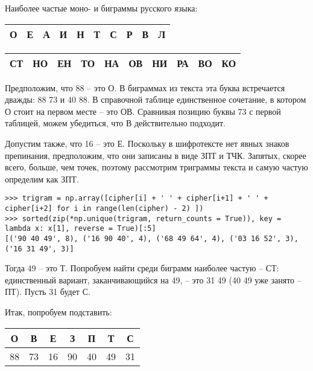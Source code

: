 \documentclass[letterpaper,11pt,openany]{book}
\begin{document}
Наиболее частые моно- и биграммы русского языка:

\medskip

{\centering
\begin{tabular}{||c|c|c|c|c|c|c|c|c|c||}
\hline
\textbf{О} & \textbf{Е} & \textbf{А} & \textbf{И} & \textbf{Н} & \textbf{Т} & \textbf{С} & \textbf{Р} & \textbf{В} & \textbf{Л} \\
\hline
\end{tabular}

}

\medskip

{\centering
\begin{tabular}{||c|c|c|c|c|c|c|c|c|c||}
\hline
\textbf{СТ} & \textbf{НО} & \textbf{ЕН} & \textbf{ТО} & \textbf{НА} & \textbf{ОВ} & \textbf{НИ} & \textbf{РА} & \textbf{ВО} & \textbf{КО} \\
\hline
\end{tabular}

}

\medskip


\medskip

Предположим, что 88 -- это О. В биграммах из текста эта буква встречается дважды: 88 73 и 40 88. В справочной таблице единственное сочетание, в котором О стоит на первом месте -- это ОВ. Сравнивая позицию буквы 73 с первой таблицей, можем убедиться, что В действительно подходит. 

Допустим также, что 16 -- это Е. Поскольку в шифротексте нет явных знаков препинания, предположим, что они записаны в виде ЗПТ и ТЧК. Запятых, скорее всего, больше, чем точек, поэтому рассмотрим триграммы текста и самую частую определим как ЗПТ.

\begin{lstlisting}
>>> trigram = np.array([cipher[i] + ' ' + cipher[i+1] + ' ' + cipher[i+2] for i in range(len(cipher) - 2) ])
>>> sorted(zip(*np.unique(trigram, return_counts = True)), key = lambda x: x[1], reverse = True)[:5]
[('90 40 49', 8), ('16 90 40', 4), ('68 49 64', 4), ('03 16 52', 3), ('16 31 49', 3)]
\end{lstlisting}

Тогда 49 -- это Т. Попробуем найти среди биграмм наиболее частую -- СТ: единственный вариант, заканчивающийся на 49, -- это 31 49 (40 49 уже занято -- ПТ). Пусть 31 будет С.

Итак, попробуем подставить:

\medskip

{\centering
\begin{tabular}{||c|c|c|c|c|c|c||}
\hline
\textbf{О} & \textbf{В} & \textbf{Е} & \textbf{З} & \textbf{П} & \textbf{Т} & \textbf{С} \\
\hline
88 & 73 & 16 & 90 & 40 & 49 & 31  \\
\hline
\end{tabular}

}
\end{document}
